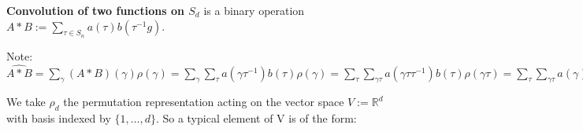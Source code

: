 \documentclass[12pt,a4paper]{article}
\begin{document}
\textbf{Convolution of two functions on $S_d$} is a binary operation $A * B := \ensuremath{\sum}_{\ensuremath{\tau} \ensuremath{\in} S_n} a(\ensuremath{\tau}) b(\ensuremath{\tau}^{-1}g)$.

Note: $\widehat{A*B} = \ensuremath{\sum}_{\ensuremath{\gamma}} (A*B)(\ensuremath{\gamma})\ensuremath{\rho}(\ensuremath{\gamma})  = \ensuremath{\sum}_{\ensuremath{\gamma} } \ensuremath{\sum}_{\ensuremath{\tau}} a(\ensuremath{\gamma} \ensuremath{\tau}^{-1})b(\ensuremath{\tau})\rho(\ensuremath{\gamma} ) = \ensuremath{\sum}_{\ensuremath{\tau}} \ensuremath{\sum}_{\ensuremath{\gamma}\ensuremath{\tau}} a(\ensuremath{\gamma} \ensuremath{\tau} \ensuremath{\tau}^{-1})b(\ensuremath{\tau})\ensuremath{\rho}(\ensuremath{\gamma}\ensuremath{\tau}) = \ensuremath{\sum}_{\ensuremath{\tau}} \ensuremath{\sum}_{\ensuremath{\gamma}\ensuremath{\tau}} a(\ensuremath{\gamma})b(\ensuremath{\tau})\ensuremath{\rho}(\ensuremath{\gamma})\ensuremath{\rho}(\ensuremath{\tau}) = \ensuremath{\sum}_{\ensuremath{\tau}} b(\ensuremath{\tau})\ensuremath{\rho}(\ensuremath{\tau}) \ensuremath{\sum}_{\ensuremath{\gamma}\ensuremath{\tau}} a(\ensuremath{\gamma})\ensuremath{\rho}(\ensuremath{\gamma})  = \ensuremath{\sum}_{\ensuremath{\tau}} b(\ensuremath{\tau})\ensuremath{\rho}(\ensuremath{\tau}) \hat{A} = \hat{A} \ensuremath{\sum}_{\ensuremath{\tau}} b(\ensuremath{\tau})\rho(\ensuremath{\tau}) = \hat{A} \cdot \hat{B}$

We take $\ensuremath{\rho}_d$ the permutation representation acting on the vector space $V := \mathbb{R}^d$ with basis indexed by $\{1,\ensuremath{\ldots},d\}$. So a typical element of V is of the form: 
\end{document}
